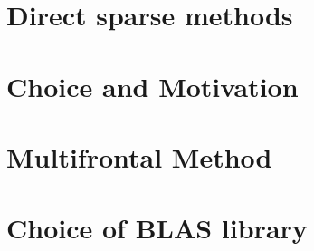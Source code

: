 










\section{Direct sparse methods}
\label{subseq:sparse methods}








\section{Choice and Motivation}
\label{subseq:choice and motivation}



\section{Multifrontal Method}
\label{subseq:multifrontal method}

\section{Choice of BLAS library}
\label{subseq:blas-comparison}

